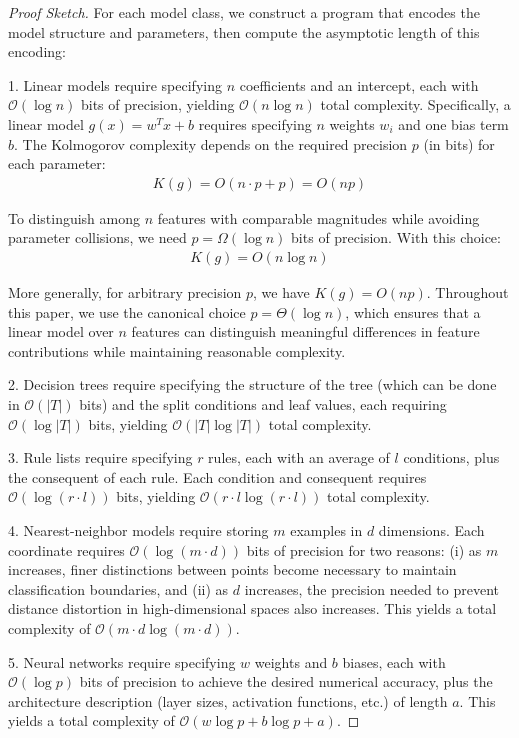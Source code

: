 \documentclass[11pt,letter,leqno]{article}
\begin{document}
\begin{proof}[Proof Sketch]
For each model class, we construct a program that encodes the model structure and parameters, then compute the asymptotic length of this encoding:

1. Linear models require specifying $n$ coefficients and an intercept, each with $\mathcal{O}(\log n)$ bits of precision, yielding $\mathcal{O}(n \log n)$ total complexity.  Specifically, a linear model $g(x) = w^T x + b$ requires specifying $n$ weights $w_i$ and one bias term $b$. The Kolmogorov complexity depends on the required precision $p$ (in bits) for each parameter:
\begin{align}
K(g) = O(n \cdot p + p) = O(np)
\end{align}

To distinguish among $n$ features with comparable magnitudes while avoiding parameter collisions, we need $p = \Omega(\log n)$ bits of precision. With this choice:
\begin{align}
K(g) = O(n \log n)
\end{align}

More generally, for arbitrary precision $p$, we have $K(g) = O(np)$. Throughout this paper, we use the canonical choice $p = \Theta(\log n)$, which ensures that a linear model over $n$ features can distinguish meaningful differences in feature contributions while maintaining reasonable complexity.

2. Decision trees require specifying the structure of the tree (which can be done in $\mathcal{O}(|T|)$ bits) and the split conditions and leaf values, each requiring $\mathcal{O}(\log |T|)$ bits, yielding $\mathcal{O}(|T| \log |T|)$ total complexity.

3. Rule lists require specifying $r$ rules, each with an average of $l$ conditions, plus the consequent of each rule.  Each condition and consequent requires $\mathcal{O}(\log(r \cdot l))$ bits, yielding $\mathcal{O}(r \cdot l \log(r \cdot l))$ total complexity.

4. Nearest-neighbor models require storing $m$ examples in $d$ dimensions.  Each coordinate requires $\mathcal{O}(\log(m \cdot d))$ bits of precision for two reasons: (i) as $m$ increases, finer distinctions between points become necessary to maintain classification boundaries, and (ii) as $d$ increases, the precision needed to prevent distance distortion in high-dimensional spaces also increases.  This yields a total complexity of $\mathcal{O}(m \cdot d \log(m \cdot d))$.

5. Neural networks require specifying $w$ weights and $b$ biases, each with $\mathcal{O}(\log p)$ bits of precision to achieve the desired numerical accuracy, plus the architecture description (layer sizes, activation functions, etc.) of length $a$.  This yields a total complexity of $\mathcal{O}(w \log p + b \log p + a)$.
\end{proof}
\end{document}
